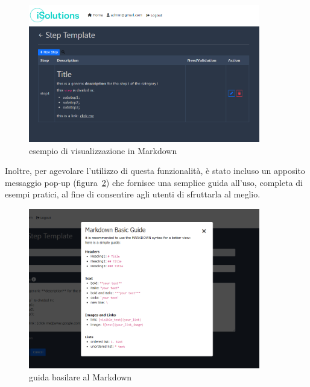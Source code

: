 \begin{figure}[H]
	\centering
	\includegraphics[width=0.9\textwidth]{img/markdown_pt2.png}
	\caption{esempio di visualizzazione in Markdown}
	\label{fig:markdown}
\end{figure}

Inoltre, per agevolare l'utilizzo di questa funzionalità, è stato incluso un apposito 
messaggio pop-up (figura~\ref{fig:markdownGuide}) che fornisce una semplice guida all'uso, completa di esempi pratici, 
al fine di consentire agli utenti di sfruttarla al meglio.

\begin{figure}[H]
	\centering
	\includegraphics[width=0.9\textwidth]{img/markdownGuide1.png}
	\caption{guida basilare al Markdown}
	\label{fig:markdownGuide}
\end{figure}